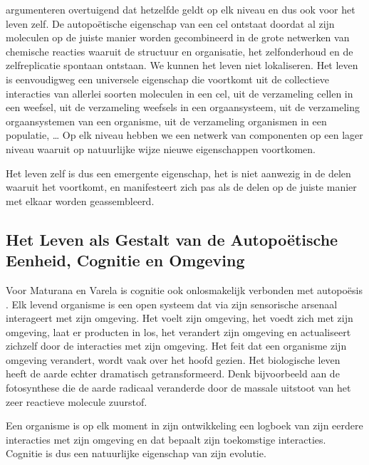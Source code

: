 \documentclass[
  11pt,
]{book}
\begin{document}
\citet{capraLuisi2014} argumenteren overtuigend dat hetzelfde geldt op elk niveau en dus ook voor het leven zelf. De autopoëtische eigenschap van een cel ontstaat doordat al zijn moleculen op de juiste manier worden gecombineerd in de grote netwerken van chemische reacties waaruit de structuur en organisatie, het zelfonderhoud en de zelfreplicatie spontaan ontstaan. We kunnen het leven niet lokaliseren. Het leven is eenvoudigweg een universele eigenschap die voortkomt uit de collectieve interacties van allerlei soorten moleculen in een cel, uit de verzameling cellen in een weefsel, uit de verzameling weefsels in een orgaansysteem, uit de verzameling orgaansystemen van een organisme, uit de verzameling organismen in een populatie, \ldots{} Op elk niveau hebben we een netwerk van componenten op een lager niveau waaruit op natuurlijke wijze nieuwe eigenschappen voortkomen.

Het leven zelf is dus een emergente eigenschap, het is niet aanwezig in de delen waaruit het voortkomt, en manifesteert zich pas als de delen op de juiste manier met elkaar worden geassembleerd.

\hypertarget{het-leven-als-gestalt-van-de-autopouxebtische-eenheid-cognitie-en-omgeving}{%
\subsection{Het Leven als Gestalt van de Autopoëtische Eenheid, Cognitie en Omgeving}\label{het-leven-als-gestalt-van-de-autopouxebtische-eenheid-cognitie-en-omgeving}}

Voor Maturana en Varela is cognitie ook onlosmakelijk verbonden met autopoësis \citep{capraLuisi2014}. Elk levend organisme is een open systeem dat via zijn sensorische arsenaal interageert met zijn omgeving. Het voelt zijn omgeving, het voedt zich met zijn omgeving, laat er producten in los, het verandert zijn omgeving en actualiseert zichzelf door de interacties met zijn omgeving. Het feit dat een organisme zijn omgeving verandert, wordt vaak over het hoofd gezien. Het biologische leven heeft de aarde echter dramatisch getransformeerd. Denk bijvoorbeeld aan de fotosynthese die de aarde radicaal veranderde door de massale uitstoot van het zeer reactieve molecule zuurstof.

Een organisme is op elk moment in zijn ontwikkeling een logboek van zijn eerdere interacties met zijn omgeving en dat bepaalt zijn toekomstige interacties. Cognitie is dus een natuurlijke eigenschap van zijn evolutie.
\end{document}
